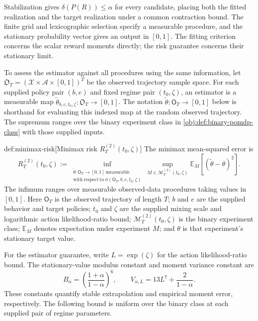 Stabilization gives \(\delta(P(R))\leq\alpha\) for every candidate, placing both the fitted realization and the target realization under a common contraction bound. The finite grid and lexicographic selection specify a measurable procedure, and the stationary probability vector  gives an output in \([0,1]\). The fitting criterion concerns the scalar reward moments directly; the risk guarantee concerns their stationary limit.

To assess the estimator against all procedures using the same information, let \(\mathfrak O_T=(\mathcal X\times\mathcal A\times[0,1])^T\) be the observed trajectory sample space. For each supplied policy pair \((b,e)\) and fixed regime pair \((t_0,\zeta)\), an estimator is a measurable map \(\widetilde\theta_{b,e,t_0,\zeta}\colon\mathfrak O_T\to[0,1]\). The notation \(\widetilde\theta\colon\mathsf O_T\to[0,1]\) below is shorthand for evaluating this indexed map at the random observed trajectory. The supremum ranges over the binary experiment class in \cref{obj:def:binary-pomdp-class} with those supplied inputs.

\begin{definitionv}{def:minimax-risk}[Minimax risk $R_T^{(2)}(t_0,\zeta)$]
The minimax mean-squared error is
\[
R_T^{(2)}(t_0,\zeta)
:=
\inf_{\substack{\widetilde\theta\colon \mathsf O_T\to[0,1]\ \mathrm{measurable}\\
\mathrm{with\ respect\ to}\ \sigma(\mathsf O_T,b,e,t_0,\zeta)}}
\sup_{M\in\mathcal M_T^{(2)}(t_0,\zeta)}
\mathbb E_M\!\left[(\widetilde\theta-\theta)^2\right].
\]
The infimum ranges over measurable observed-data procedures taking values in \( [0,1] \). Here \(\mathsf O_T\) is the observed trajectory of length \(T\); \(b\) and \(e\) are the supplied behavior and target policies; \(t_0\) and \(\zeta\) are the supplied mixing scale and logarithmic action likelihood-ratio bound; \(\mathcal M_T^{(2)}(t_0,\zeta)\) is the binary experiment class; \(\mathbb E_M\) denotes expectation under experiment \(M\); and \(\theta\) is that experiment's stationary target value.
\end{definitionv}

For the estimator guarantee, write \(L=\exp(\zeta)\) for the action likelihood-ratio bound. The stationary-value modulus constant  and moment variance constant  are
\[
B_\alpha=\left(\frac{1+\alpha}{1-\alpha}\right)^6,
\qquad
V_{\alpha,L}=13L^7+\frac{2}{1-\alpha}.
\]
These constants quantify stable extrapolation and empirical moment error, respectively. The following bound is uniform over the binary class at each supplied pair of regime parameters.

